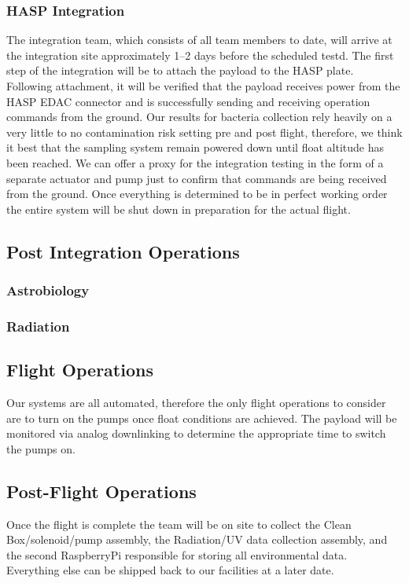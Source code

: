 
\subsubsection{HASP Integration}
The integration team, which consists of all team members to date, will arrive at the integration site approximately \numrange{1}{2} days before the scheduled testd. The first step of the integration will be to attach the payload to the HASP plate. Following attachment, it will be verified that the payload receives power from the HASP EDAC connector and is successfully sending and receiving operation commands from the ground. Our results for bacteria collection rely heavily on a very little to no contamination risk setting pre and post flight, therefore, we think it best that the sampling system remain powered down until float altitude has been reached. We can offer a proxy for the integration testing in the form of a separate actuator and pump just to confirm that commands are being received from the ground. Once everything is determined to be in perfect working order the entire system will be shut down in preparation for the actual flight.

\subsection{Post Integration Operations}

\subsubsection{Astrobiology}


\subsubsection{Radiation}


\subsection{Flight Operations}
Our systems are all automated, therefore the only flight operations to consider are to turn on the pumps once float conditions are achieved. The payload will be monitored via analog downlinking to determine the appropriate time to switch the pumps on. 

\subsection{Post-Flight Operations}
Once the flight is complete the team will be on site to collect the Clean Box/solenoid/pump assembly, the Radiation/UV data collection assembly, and the second RaspberryPi responsible for storing all environmental data. Everything else can be shipped back to our facilities at a later date.  



